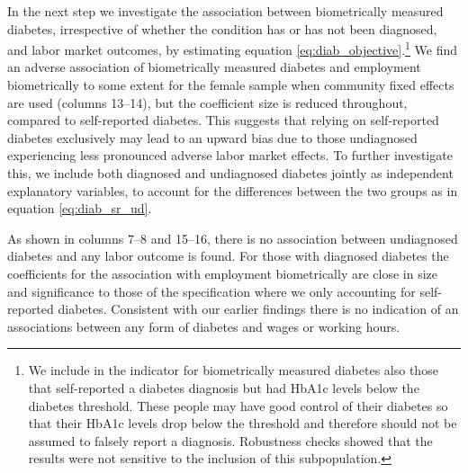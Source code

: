 \documentclass[12pt,english,british]{article}
\begin{document}
In the next step we investigate the association between biometrically measured
diabetes, irrespective of whether
the condition has or has not been diagnosed, and labor market outcomes, by estimating equation \ref{eq:diab_objective}.\footnote{We include in the indicator for biometrically measured diabetes also those that self-reported a diabetes diagnosis
but had \ac{HbA1c} levels below the diabetes threshold. These people may have good control of their diabetes so that their \ac{HbA1c} levels drop below the threshold and therefore should not be assumed to falsely report a diagnosis. Robustness checks showed that the results were not sensitive to the inclusion of this subpopulation.}  We find an adverse association of biometrically measured diabetes and employment
biometrically to some extent for the female sample when community fixed effects are used (columns 13--14), but the coefficient size is reduced throughout, compared to self-reported diabetes. This suggests that relying on self-reported
diabetes exclusively may lead to an upward bias due to those undiagnosed experiencing less pronounced adverse labor market effects.
To further investigate this, we include both diagnosed and undiagnosed diabetes jointly as independent explanatory variables, to account for the differences between the two groups as in equation \ref{eq:diab_sr_ud}.

As shown in columns 7--8 and 15--16, there is no association between undiagnosed
diabetes and any labor outcome is found. For those with diagnosed
diabetes the coefficients for the association with employment biometrically
are close in size and significance to those of the specification where we only accounting for self-reported diabetes. Consistent with our earlier findings there is no indication of an associations between any form of diabetes and wages or working hours. 
 
\end{document}
